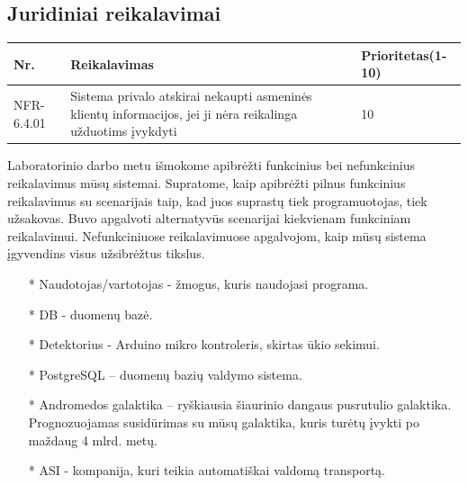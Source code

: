 \documentclass[oneside]{VUMIFPSkursinis}
\begin{document}
\subsection{Juridiniai reikalavimai}
\begin{table}[htbp]
	\begin{tabularx}{1\textwidth}{ |P{2.5cm}|X|P{3cm }| }  \hline
		Nr. & Reikalavimas & Prioritetas(1-10) \\ \hline
		NFR-6.4.01 & Sistema privalo atskirai nekaupti asmeninės klientų informacijos, jei ji nėra reikalinga užduotims įvykdyti & 10 \\ \hline
	\end{tabularx}
\end{table}
\pagebreak
\justify
{}
Laboratorinio darbo metu išmokome apibrėžti funkcinius bei nefunkcinius reikalavimus mūsų sistemai. Supratome, kaip apibrėžti pilnus funkcinius reikalavimus su scenarijais taip, kad juos suprastų tiek programuotojas, tiek užsakovas. Buvo apgalvoti alternatyvūs scenarijai kiekvienam funkciniam reikalavimui. Nefunkciniuose reikalavimuose apgalvojom, kaip mūsų sistema įgyvendins visus užsibrėžtus tikslus.

\begin{itemize}
\item[*] Naudotojas/vartotojas - žmogus, kuris naudojasi programa.
\item[*] DB - duomenų bazė.
\item[*] Detektorius - Arduino mikro kontroleris, skirtas ūkio sekimui.
\item[*] PostgreSQL – duomenų bazių valdymo sistema.
\item[*] Andromedos galaktika – ryškiausia šiaurinio dangaus pusrutulio galaktika.  Prognozuojamas susidūrimas su mūsų galaktika, kuris turėtų įvykti po maždaug 4 mlrd. metų. 
\item[*] ASI - kompanija, kuri teikia automatiškai valdomą transportą.

\end{itemize}
\end{document}
